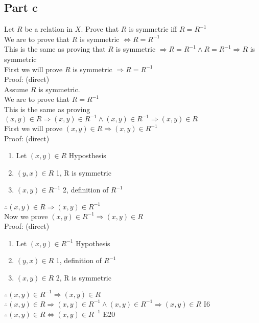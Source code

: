 \documentclass{article}
\begin{document}
		\subsection {Part c}
			Let $R$ be a relation in $X$. Prove that $R$ is symmetric iff $R = R^{-1}$ \\
			We are to prove that $R$ is symmetric $\Leftrightarrow R = R^{-1}$ \\
			This is the same as proving that $R$ is symmetric $\Rightarrow R = R^{-1} \land R = R^{-1} \Rightarrow R$ is symmetric \\
			First we will prove $R$ is symmetric $\Rightarrow R = R^{-1}$ \\
			Proof: (direct) \\
			Assume $R$ is symmetric. \\
			We are to prove that $R = R^{-1}$ \\
			This is the same as proving $(x, y) \in R \Rightarrow (x, y) \in R^{-1} \land (x, y) \in R^{-1} \Rightarrow (x, y) \in R$ \\
			First we will prove $(x, y) \in R \Rightarrow (x, y) \in R^{-1}$ \\
			Proof: (direct)
			\begin{enumerate}
				\item Let $(x, y) \in R$ \hfill Hyposthesis
				\item $(y, x) \in R$ \hfill 1, R is symmetric
				\item $(x, y) \in R^{-1}$ \hfill 2, definition of $R^{-1}$
			\end{enumerate}
			$\therefore (x, y) \in R \Rightarrow (x, y) \in R^{-1}$ \\
			Now we prove $(x, y) \in R^{-1} \Rightarrow (x, y) \in R$ \\
			Proof: (direct)
			\begin{enumerate}
				\item Let $(x, y) \in R^{-1}$ \hfill Hypothesis
				\item $(y, x) \in R$ \hfill 1, definition of $R^{-1}$
				\item $(x, y) \in R$ \hfill 2, R is symmetric
			\end{enumerate}
			$\therefore (x, y) \in R^{-1} \Rightarrow (x, y) \in R$ \\
			$\therefore (x, y) \in R \Rightarrow (x, y) \in R^{-1} \land (x, y) \in R^{-1} \Rightarrow (x, y) \in R$ \hfill I6\\
			$\therefore (x, y) \in R \Leftrightarrow (x, y) \in R^{-1}$ \hfill E20\\
\end{document}
